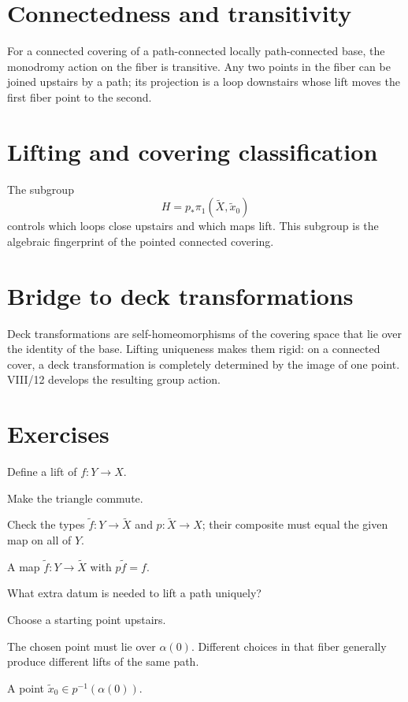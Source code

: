 \section{Connectedness and transitivity}

For a connected covering of a path-connected locally path-connected base, the
monodromy action on the fiber is transitive.  Any two points in the fiber can
be joined upstairs by a path; its projection is a loop downstairs whose lift
moves the first fiber point to the second.

\section{Lifting and covering classification}

The subgroup
\[
H=p_*\pi_1(\widetilde X,\tilde x_0)
\]
controls which loops close upstairs and which maps lift.  This subgroup is the
algebraic fingerprint of the pointed connected covering.

\section{Bridge to deck transformations}

Deck transformations are self-homeomorphisms of the covering space that lie
over the identity of the base.  Lifting uniqueness makes them rigid: on a
connected cover, a deck transformation is completely determined by the image
of one point.  VIII/12 develops the resulting group action.


\section{Exercises}

\begin{exercise}\label{exr:viii11-01}
Define a lift of \(f:Y\to X\).
\end{exercise}
\begin{hint}
Make the triangle commute.

Check the types \(\widetilde f:Y\to\widetilde X\) and \(p:\widetilde X\to X\); their composite must equal the given map on all of \(Y\).
\end{hint}
\begin{solution}
A map \(\widetilde f:Y\to\widetilde X\) with \(p\widetilde f=f\).
\end{solution}

\begin{exercise}\label{exr:viii11-02}
What extra datum is needed to lift a path uniquely?
\end{exercise}
\begin{hint}
Choose a starting point upstairs.

The chosen point must lie over \(\alpha(0)\). Different choices in that fiber generally produce different lifts of the same path.
\end{hint}
\begin{solution}
A point \(\tilde x_0\in p^{-1}(\alpha(0))\).
\end{solution}

